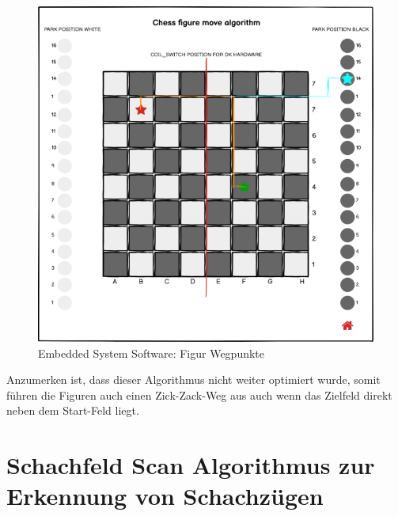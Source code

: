 \begin{figure}
\centering
\includegraphics{images/ATC_FigureMoveAlgorithm.png}
\caption{Embedded System Software: Figur Wegpunkte
\label{ATC_FigureMoveAlgorithm}}
\end{figure}

Anzumerken ist, dass dieser Algorithmus nicht weiter optimiert wurde,
somit führen die Figuren auch einen Zick-Zack-Weg aus auch wenn das
Zielfeld direkt neben dem Start-Feld liegt.

\hypertarget{schachfeld-scan-algorithmus-zur-erkennung-von-schachzuxfcgen}{%
\section{Schachfeld Scan Algorithmus zur Erkennung von
Schachzügen}\label{schachfeld-scan-algorithmus-zur-erkennung-von-schachzuxfcgen}}

